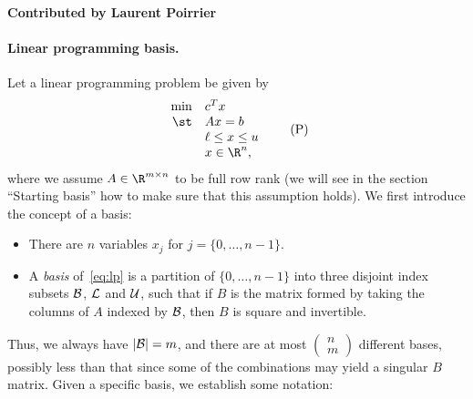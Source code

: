 \textbf{Contributed by Laurent Poirrier}

\paragraph{Linear programming basis.}

Let a linear programming problem be given by
\begin{equation}
\begin{array}{rl}
\min & c^T x \\
\st  & A x = b \\
     & \ell \leq x \leq u \\
     & x \in \R^n,
\end{array}
\tag{P}
\label{eq:lp}
\end{equation}
where we assume $A \in \R^{m \times n}$ to be full row rank
(we will see in the section ``Starting basis'' how to make
sure that this assumption holds).
We first introduce the concept of a basis:
\begin{itemize}
\item There are $n$ variables $x_j$ for $j = \{ 0, \ldots, n-1 \}$.
\item A \emph{basis} of~\eqref{eq:lp} is a partition of
$\{ 0, \ldots, n-1 \}$ into three disjoint index subsets
$\mathcal{B}$, $\mathcal{L}$ and $\mathcal{U}$, such that
if $B$ is the matrix formed by taking
the columns of $A$ indexed by $\mathcal{B}$, then $B$ is square and
invertible.
\end{itemize}
Thus, we always have $|\mathcal{B}| = m$, and there are at most
$\left( \begin{smallmatrix} n \\ m \end{smallmatrix} \right)$ different
bases, possibly less than that since some of the combinations
may yield a singular $B$ matrix.
Given a specific basis, we establish some notation: 
